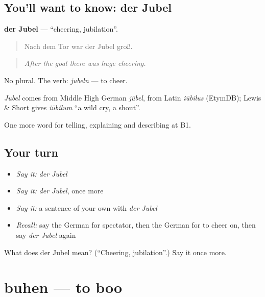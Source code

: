 \subsection*{You'll want to know: der Jubel}
\textbf{der Jubel} — \textquotedblleft{}cheering, jubilation\textquotedblright{}.

\begin{quote}
Nach dem Tor war der Jubel groß.
\end{quote}

\begin{quote}
\emph{After the goal there was huge cheering.}
\end{quote}

No plural. The verb: \emph{jubeln} — to cheer.

\begin{cousinweb}
\emph{Jubel} comes from Middle High German \emph{jūbel}, from Latin \emph{iūbilus} (EtymDB); Lewis \& Short gives \emph{iūbilum} \textquotedblleft{}a wild cry, a shout\textquotedblright{}.
\end{cousinweb}

\begin{grammarlens}[title={What you've built}]
One more word for telling, explaining and describing at B1.
\end{grammarlens}

\subsection*{Your turn}
\begin{itemize}
\raggedright
  \item \emph{Say it:} \emph{der Jubel}
  \item \emph{Say it:} \emph{der Jubel}, once more
  \item \emph{Say it:} a sentence of your own with \emph{der Jubel}
  \item \emph{Recall:} say the German for spectator, then the German for to cheer on, then say \emph{der Jubel} again
\end{itemize}

\begin{tcolorbox}[breakable,colback=teal!4,colframe=teal!35!black,title={Before you move on}]
What does der Jubel mean? (\textquotedblleft{}Cheering, jubilation\textquotedblright{}.) Say it once more.
\end{tcolorbox}
\section[buhen]{buhen — to boo}

